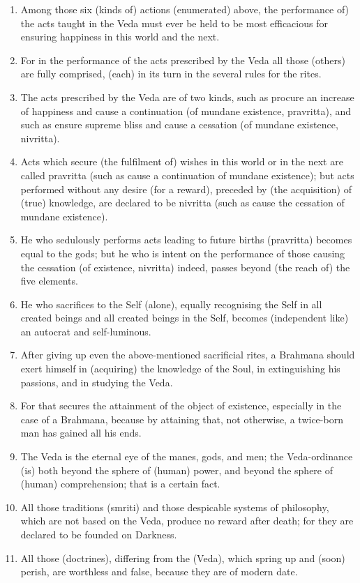 \begin{enumerate}
\item Among those six (kinds of) actions (enumerated) above, the performance of) the acts taught in the Veda must ever be held to be most efficacious for ensuring happiness in this world and the next.
\item For in the performance of the acts prescribed by the Veda all those (others) are fully comprised, (each) in its turn in the several rules for the rites.
\item The acts prescribed by the Veda are of two kinds, such as procure an increase of happiness and cause a continuation (of mundane existence, pravritta), and such as ensure supreme bliss and cause a cessation (of mundane existence, nivritta).
\item Acts which secure (the fulfilment of) wishes in this world or in the next are called pravritta (such as cause a continuation of mundane existence); but acts performed without any desire (for a reward), preceded by (the acquisition) of (true) knowledge, are declared to be nivritta (such as cause the cessation of mundane existence).
\item He who sedulously performs acts leading to future births (pravritta) becomes equal to the gods; but he who is intent on the performance of those causing the cessation (of existence, nivritta) indeed, passes beyond (the reach of) the five elements.
\item He who sacrifices to the Self (alone), equally recognising the Self in all created beings and all created beings in the Self, becomes (independent like) an autocrat and self-luminous.
\item After giving up even the above-mentioned sacrificial rites, a Brahmana should exert himself in (acquiring) the knowledge of the Soul, in extinguishing his passions, and in studying the Veda.
\item For that secures the attainment of the object of existence, especially in the case of a Brahmana, because by attaining that, not otherwise, a twice-born man has gained all his ends.
\item The Veda is the eternal eye of the manes, gods, and men; the Veda-ordinance (is) both beyond the sphere of (human) power, and beyond the sphere of (human) comprehension; that is a certain fact.
\item All those traditions (smriti) and those despicable systems of philosophy, which are not based on the Veda, produce no reward after death; for they are declared to be founded on Darkness.
\item All those (doctrines), differing from the (Veda), which spring up and (soon) perish, are worthless and false, because they are of modern date.

\end{enumerate}
